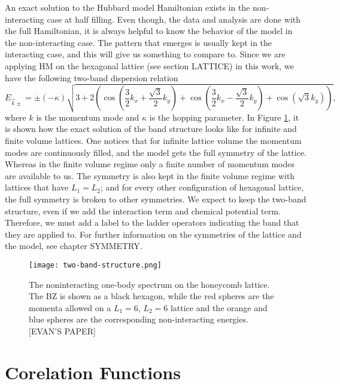 An exact solution to the Hubbard model Hamiltonian exists in the non-interacting case at half filling. Even though, the data and analysis are done with the full Hamiltonian, it is always helpful to know the behavior of the model in the non-interacting case. The pattern that emerges is usually kept in the interacting case, and this will give us something to compare to. Since we are applying HM on the hexagonal lattice (see section LATTICE) in this work, we have the following two-band dispersion relation
\begin{equation}
    E_{\vec{k}\pm} = \pm (-\kappa) \sqrt{3 + 2 \left( \cos\left( \frac{3}{2}k_x + \frac{\sqrt{3}}{2}k_y \right) + \cos\left( \frac{3}{2}k_x - \frac{\sqrt{3}}{2}k_y \right) + \cos\left( \sqrt{3}k_y \right) \right)},
\end{equation}
where $k$ is the momentum mode and $\kappa$ is the hopping parameter. In Figure \ref{fig:two-band}, it is shown how the exact solution of the band structure looks like for infinite and finite volume lattices. One notices that for infinite lattice volume the momentum modes are continuously filled, and the model gets the full symmetry of the lattice. Whereas in the finite volume regime only a finite number of momentum modes are available to us. The symmetry is also kept in the finite volume regime with lattices that have $L_1 = L_2$; and for every other configuration of hexagonal lattice, the full symmetry is broken to other symmetries. We expect to keep the two-band structure, even if we add the interaction term and chemical potential term. Therefore, we must add a label to the ladder operators indicating the band that they are applied to. For further information on the symmetries of the lattice and the model, see chapter SYMMETRY.
\begin{figure}[htbp]
    \centerline{\texttt{[image: two-band-structure.png]}}
    \caption{The noninteracting one-body spectrum on the honeycomb lattice. The BZ is shown as a black hexagon, while the red spheres are the momenta allowed on a $L_1 = 6$, $L_2 = 6$ lattice and the orange and blue spheres are the corresponding non-interacting energies. [EVAN'S PAPER]}
    \label{fig:two-band}
\end{figure}


\section{Corelation Functions}
\label{sec:corr_func}

